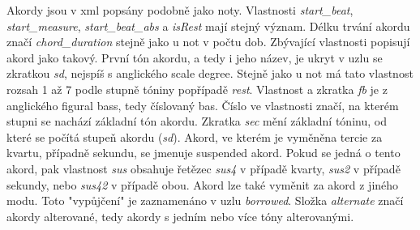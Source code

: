 Akordy jsou v xml popsány podobně jako noty.
Vlastnosti \emph{start\_beat}, \emph{start\_measure}, \emph{start\_beat\_abs}
a \emph{isRest} mají stejný význam.
Délku trvání akordu značí \emph{chord\_duration} stejně jako u not v počtu dob.
Zbývající vlastnosti popisují akord jako takový.
První tón akordu, a tedy i jeho název, 
je ukryt v uzlu se zkratkou \emph{sd},
nejspíš s anglického scale degree.
Stejně jako u not má tato vlastnost rozsah 1 až 7 podle stupně tóniny 
popřípadě \emph{rest}.
Vlastnost a zkratka \emph{fb} je z anglického figural bass, 
tedy číslovaný bas. 
Číslo ve vlastnosti značí, 
na kterém stupni se nachází základní tón akordu\cite{kofron}.
Zkratka \emph{sec} mění základní tóninu,
od které se počítá stupeň akordu (\emph{sd}).
Akord, ve kterém je vyměněna tercie za kvartu, případně sekundu,
se jmenuje suspended akord.
Pokud se jedná o tento akord, 
pak vlastnost \emph{sus} obsahuje řetězec \emph{sus4} v případě kvarty,
\emph{sus2} v případě sekundy, nebo \emph{sus42} v případě obou\cite{SimplifyingSuspended}.
Akord lze také vyměnit za akord z jiného modu.
Toto "vypůjčení" je zaznamenáno v uzlu \emph{borrowed}.
Složka \emph{alternate} značí akordy alterované, 
tedy akordy s jedním nebo více tóny alterovanými\cite{SzkanderaAlterovane}.

